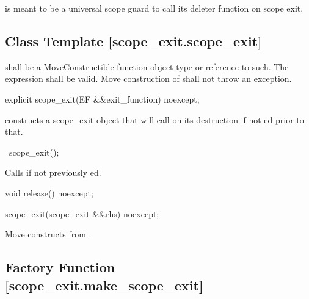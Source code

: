 \documentclass[ebook,11pt,article]{memoir}
\begin{document}
\pnum
\enternote
{} is meant to be a universal scope guard to call its deleter function on scope exit.
\exitnote

\subsection {Class Template  [scope_exit.scope_exit]}

\pnum
\requires {} shall be a MoveConstructible function object type or reference to such.
The expression  shall be valid.
Move construction of  shall not throw an exception.


\begin{itemdecl}
explicit
scope_exit(EF &&exit_function) noexcept;
\end{itemdecl}


\pnum
\effects constructs a scope_exit object that will call  on its destruction if not ed prior to that. %

\begin{itemdecl}
~scope_exit();
\end{itemdecl}

\pnum
\effects Calls  if not previously ed.


\begin{itemdecl}
void release() noexcept;
\end{itemdecl}

\pnum
\effects {}

\begin{itemdecl}
scope_exit(scope_exit  &&rhs) noexcept;
\end{itemdecl}

\pnum
\effects Move constructs  from . \\ 

\subsection {Factory Function  [scope_exit.make_scope_exit]}
\end{document}
